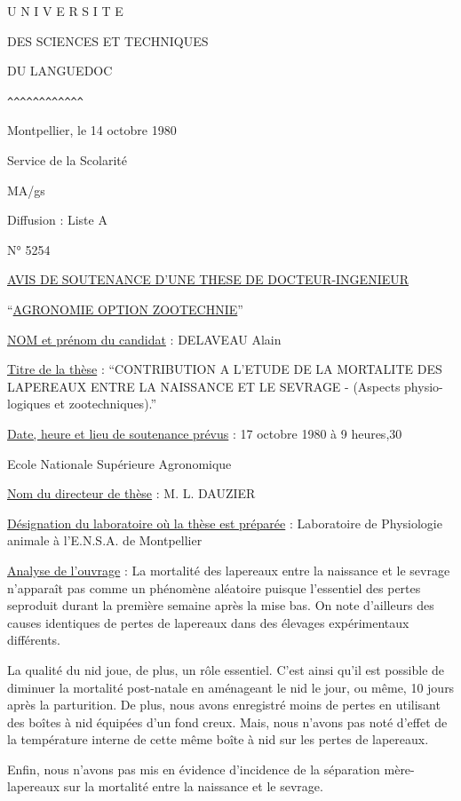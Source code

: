 
U N I V E R S I T E

DES SCIENCES ET TECHNIQUES

DU LANGUEDOC

\verb|^^^^^^^^^^^^|

\hfill Montpellier, le 14 octobre 1980

Service de la Scolarité

MA/gs

Diffusion : Liste A

N° 5254

\begin{center}
\uline{AVIS DE SOUTENANCE D'UNE THESE DE DOCTEUR-INGENIEUR}

``\uline{AGRONOMIE OPTION ZOOTECHNIE}''
\end{center}

\uline{NOM et prénom du candidat} : DELAVEAU Alain

\uline{Titre de la thèse} : ``CONTRIBUTION A L'ETUDE DE LA MORTALITE DES LAPEREAUX ENTRE LA NAISSANCE ET LE SEVRAGE - (Aspects physio-\newline
logiques et zootechniques).''

\uline{Date, heure et lieu de soutenance prévus} : 17 octobre 1980 à 9 heures,30

Ecole Nationale Supérieure Agronomique

\uline{Nom du directeur de thèse} : M. L. DAUZIER

\uline{Désignation du laboratoire où la thèse est préparée} : Laboratoire de Physiologie animale à l'E.N.S.A. de Montpellier

\uline{Analyse de l'ouvrage} : La mortalité des lapereaux entre la naissance et le sevrage n'apparaît pas comme un phénomène aléatoire puisque l'essentiel des pertes seproduit durant la première semaine après la mise bas. On note d'ailleurs des causes identiques de pertes de lapereaux dans des élevages expérimentaux différents.

La qualité du nid joue, de plus, un rôle essentiel. C'est ainsi qu'il est possible de diminuer la mortalité post-natale en aménageant le nid le jour, ou même, 10 jours après la parturition. De plus, nous avons enregistré moins de pertes en utilisant des boîtes à nid équipées d'un fond creux. Mais, nous n'avons pas noté d'effet de la température interne de cette même boîte à nid sur les pertes de lapereaux.

Enfin, nous n'avons pas mis en évidence d'incidence de la séparation mère-lapereaux sur la mortalité entre la naissance et le sevrage.


